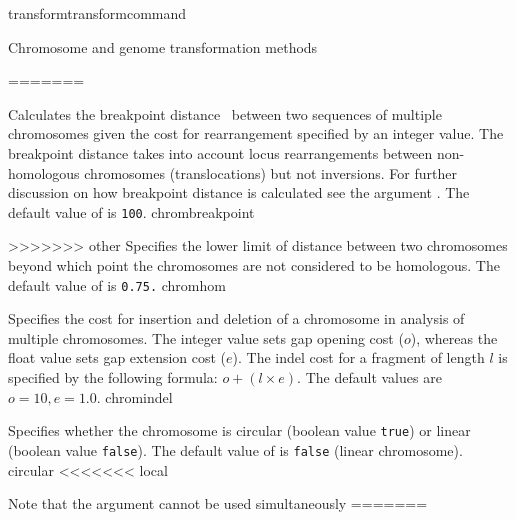 \begin{command}{transform}{transformcommand}
\begin{arguments}
\begin{argumentgroup}{Chromosome and genome transformation methods}
{=======
         
                {Calculates the breakpoint distance~\cite{blanchetteetal1997}
                between two sequences of multiple chromosomes given the cost for
                rearrangement specified by an integer value. The breakpoint distance
                takes into account locus rearrangements between non-homologous
                chromosomes (translocations) but not inversions. For further discussion on 
                how breakpoint distance is calculated see the argument .  
                The default value of  is \texttt{100}.} 
                {chrombreakpoint}
                    
>>>>>>> other
                {Specifies the lower limit of distance between two chromosomes beyond which 
                point the chromosomes are not considered to be homologous. 
                The default value of  is \texttt{0.75.}}
                {chromhom}
  
                {Specifies the cost for insertion and deletion of a chromosome in analysis of
                multiple chromosomes. The integer value sets gap opening
                cost ($o$), whereas the float value sets gap extension
                cost ($e$).  The indel cost for a fragment of length $l$ is
                specified by the following formula:
                    $o + (l \times e)$. The default values are $o=10, e=1.0$.}
                {chromindel}

                {Specifies whether the chromosome is circular (boolean value
                \texttt{true}) or linear (boolean value \texttt{false}). The
                default value of  is \texttt{false}
                (linear chromosome).}
                {circular}
<<<<<<< local
             
                \begin{statement}
  		 Note that the argument  %
		 cannot be used simultaneously
=======
         

\end{statement}}
\end{argumentgroup}
\end{arguments}
\end{command}
